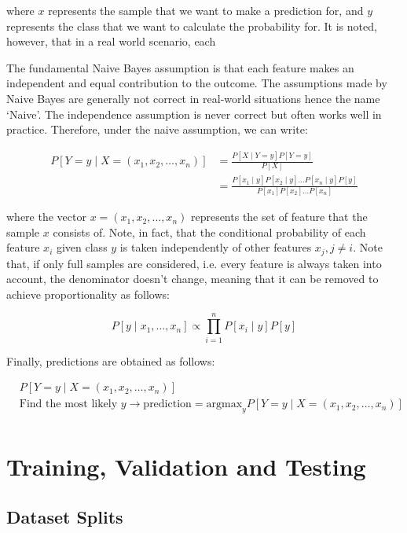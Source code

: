 where $x$ represents the sample that we want to make a prediction for, and $y$ represents the class that we want to calculate the probability for.
It is noted, however, that in a real world scenario, each 

The fundamental Naive Bayes assumption is that each feature makes an independent and equal contribution to the outcome. The assumptions made by Naive Bayes are generally not correct in real-world situations hence the name ‘Naive’. The independence assumption is never correct but often works well in practice.
Therefore, under the naive assumption, we can write:

$$
\begin{aligned}
    P[Y = y \mid X = (x_1, x_2, \dots, x_n)] & = \frac{P[X \mid Y = y]P[Y = y]}{P[X]} \\
    & = \frac{P[x_1 \mid y]P[x_2 \mid y] \dots P[x_n \mid y] P[y]}{P[x_1]P[x_2] \dots P[x_n]}
\end{aligned}
$$

where the vector $x = (x_1, x_2, \dots, x_n)$ represents the set of feature that the sample $x$ consists of. Note, in fact, that the conditional probability of each feature $x_i$ given class $y$ is taken independently of other features $x_j, j \ne i$.
Note that, if only full samples are considered, i.e. every feature is always taken into account, the denominator doesn't change, meaning that it can be removed to achieve proportionality as follows:

$$
P[y \mid x_1, \dots, x_n] \propto \prod_{i=1}^{n}{P[x_i \mid y]} P[y]
$$\label{theory_naive_bayes_formula}

Finally, predictions are obtained as follows:

$$
\begin{aligned}
    & P[Y = y \mid X = (x_1, x_2, \dots, x_n)] \\
    & \text{Find the most likely } y \to \text{prediction} = \text{argmax}_y P[Y = y \mid X = (x_1, x_2, \dots, x_n)] \\
\end{aligned}
$$


\break
\section{Training, Validation and Testing}

\subsection{Dataset Splits}

